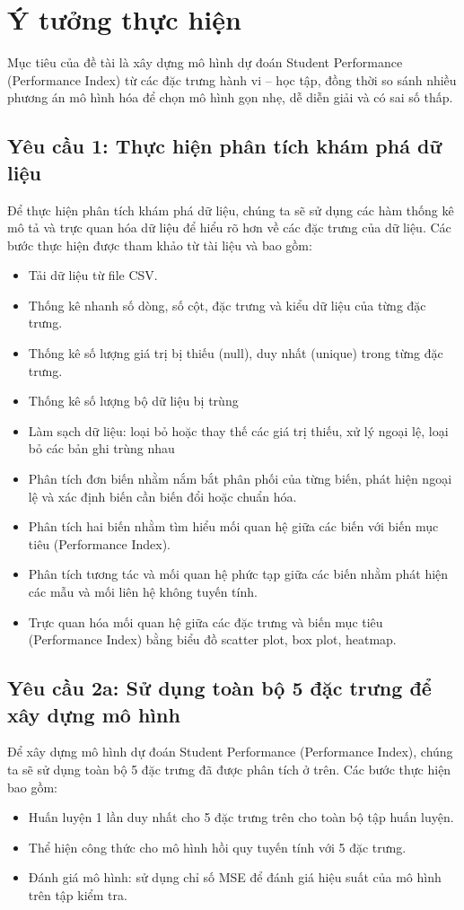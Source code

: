 \section{Ý tưởng thực hiện}
Mục tiêu của đề tài là xây dựng mô hình dự đoán Student Performance (Performance Index) từ các đặc trưng hành vi – học tập, đồng thời so sánh nhiều phương án mô hình hóa để chọn mô hình gọn nhẹ, dễ diễn giải và có sai số thấp.

\subsection{Yêu cầu 1: Thực hiện phân tích khám phá dữ liệu}
Để thực hiện phân tích khám phá dữ liệu, chúng ta sẽ sử dụng các hàm thống kê mô tả và trực quan hóa dữ liệu để hiểu rõ hơn về các đặc trưng của dữ liệu. Các bước thực hiện được tham khảo từ tài liệu \cite{EDA_purpose} và \cite{EDA_step_by_step} bao gồm:
\begin{itemize}
	\item Tải dữ liệu từ file CSV.
	\item Thống kê nhanh số dòng, số cột, đặc trưng và kiểu dữ liệu của từng đặc trưng.
	\item Thống kê số lượng giá trị bị thiếu (null), duy nhất (unique) trong từng đặc trưng.
	\item Thống kê số lượng bộ dữ liệu bị trùng
	\item Làm sạch dữ liệu: loại bỏ hoặc thay thế các giá trị thiếu, xử lý ngoại lệ, loại bỏ các bản ghi trùng nhau
	\item Phân tích đơn biến nhằm nắm bắt phân phối của từng biến, phát hiện ngoại lệ và xác định biến cần biến đổi hoặc chuẩn hóa.
	\item Phân tích hai biến nhằm tìm hiểu mối quan hệ giữa các biến với biến mục tiêu (Performance Index).
	\item Phân tích tương tác và mối quan hệ phức tạp giữa các biến nhằm phát hiện các mẫu và mối liên hệ không tuyến tính.
	\item Trực quan hóa mối quan hệ giữa các đặc trưng và biến mục tiêu (Performance Index) bằng biểu đồ scatter plot, box plot, heatmap.
\end{itemize}

\subsection{Yêu cầu 2a: Sử dụng toàn bộ 5 đặc trưng để xây dựng mô hình}
Để xây dựng mô hình dự đoán Student Performance (Performance Index), chúng ta sẽ sử dụng toàn bộ 5 đặc trưng đã được phân tích ở trên. Các bước thực hiện bao gồm:
\begin{itemize}
	\item Huấn luyện 1 lần duy nhất cho 5 đặc trưng trên cho toàn bộ tập huấn luyện.
	\item Thể hiện công thức cho mô hình hồi quy tuyến tính với 5 đặc trưng.
	\item Đánh giá mô hình: sử dụng chỉ số MSE để đánh giá hiệu suất của mô hình trên tập kiểm tra.
\end{itemize}

